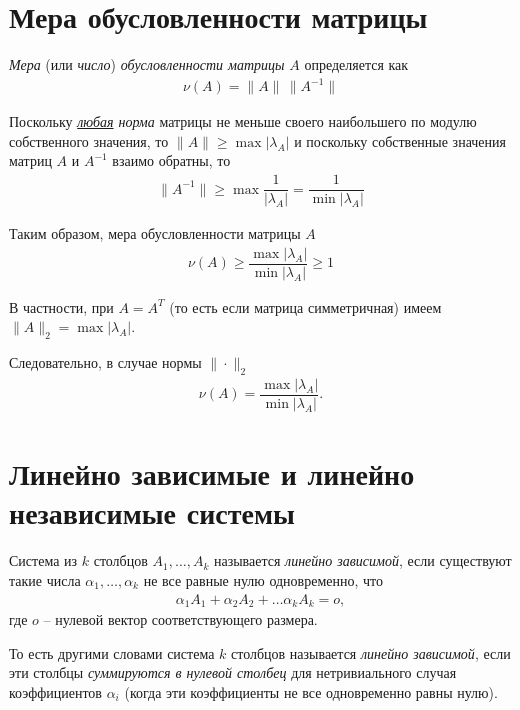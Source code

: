 \documentclass[%
	11pt,
	a4paper,
	utf8,
		]{article}
\begin{document}
\section{Мера обусловленности матрицы}

\emph{Мера} (или \emph{число}) \emph{обусловленности матрицы} $ A $ определяется как \cite[]{bahvalov:num_methods}
\begin{align*}
	\nu(A) = \| A \| \, \| A^{-1} \|
\end{align*}
 
Поскольку \emph{\underline{любая} норма} матрицы не меньше своего наибольшего по модулю собственного значения, то $ \| A \| \geqslant \max | \lambda_A | $ и поскольку собственные значения матриц $ A $ и $ A^{-1} $ взаимо обратны, то
\begin{align*}
	\| A^{-1} \| \geqslant \max \dfrac{1}{ | \lambda_A | } = \dfrac{1}{ \min | \lambda_A | }
\end{align*}

Таким образом, мера обусловленности матрицы $ A $
\begin{align*}
	\boxed{\nu(A) \geqslant \dfrac{\max | \lambda_A |}{ \min | \lambda_A | } \geqslant 1}
\end{align*}

В частности, при $ A = A^T $ (то есть если матрица симметричная) имеем $ \| A \|_2 = \max | \lambda_A | $.

Следовательно, в случае нормы $ \| \cdot \|_2 $
\begin{align*}
	\nu(A) = \dfrac{ \max | \lambda_A | }{ \min | \lambda_A | }.
\end{align*}


\section{Линейно зависимые и линейно независимые системы}

Система из $ k $ столбцов $ A_1, \ldots, A_k $ называется \emph{линейно зависимой}, если существуют такие числа $ \alpha_1, \ldots, \alpha_k $ не все равные нулю одновременно, что \cite[]{bortakovskiy:2005}
\begin{align*}
	\alpha_1 A_1 + \alpha_2 A_2 + \ldots \alpha_k A_k = o,
\end{align*}
где $ o $ -- нулевой вектор соответствующего размера.

То есть другими словами система $ k $ столбцов называется \emph{линейно зависимой}, если эти столбцы \emph{суммируются в нулевой столбец} для нетривиального случая коэффициентов $ \alpha_i $ (когда эти коэффициенты не все одновременно равны нулю).
\end{document}

